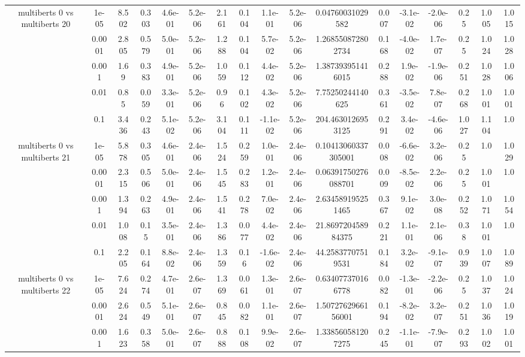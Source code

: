 \begin{tabular}{|c|c|c|c|c|c|c|c|c|c|c|c|c|c|c|c|c|}
\hline
\multirow{5}{*}{multiberts 0 vs multiberts 20} & 1e-05 & 8.502 & 0.303 & 4.6e-01 & 5.2e-06 & 2.161 & 0.104 & 1.1e-01 & 5.2e-06 & 0.04760031029582 & 0.007 & -3.1e-02 & -2.0e-06 & 0.25 & 1.005 & 1.015 \\
 & 0.0001 & 2.805 & 0.579 & 5.0e-01 & 5.2e-06 & 1.288 & 0.104 & 5.7e-02 & 5.2e-06 & 1.268550872802734 & 0.168 & -4.0e-02 & 1.7e-07 & 0.25 & 1.024 & 1.028 \\
 & 0.001 & 1.69 & 0.383 & 4.9e-01 & 5.2e-06 & 1.059 & 0.112 & 4.4e-02 & 5.2e-06 & 1.387393951416015 & 0.288 & 1.9e-02 & -1.9e-06 & 0.251 & 1.028 & 1.006 \\
 & 0.01 & 0.85 & 0.059 & 3.3e-01 & 5.2e-06 & 0.96 & 0.102 & 4.3e-02 & 5.2e-06 & 7.75250244140625 & 0.361 & -3.5e-02 & 7.8e-07 & 0.268 & 1.001 & 1.001 \\
 & 0.1 & 3.436 & 0.243 & 5.1e-02 & 5.2e-06 & 3.104 & 0.111 & -1.1e-02 & 5.2e-06 & 204.4630126953125 & 0.291 & 3.4e-02 & -4.6e-06 & 1.027 & 1.104 & 1.0 \\
\hline
\multirow{5}{*}{multiberts 0 vs multiberts 21} & 1e-05 & 5.878 & 0.305 & 4.6e-01 & 2.4e-06 & 1.524 & 0.259 & 1.0e-01 & 2.4e-06 & 0.10413060337305001 & 0.008 & -6.6e-02 & 3.2e-06 & 0.25 & 1.0 & 1.029 \\
 & 0.0001 & 2.315 & 0.506 & 5.0e-01 & 2.4e-06 & 1.545 & 0.283 & 1.2e-01 & 2.4e-06 & 0.06391750276088701 & 0.009 & -8.5e-02 & 2.2e-06 & 0.25 & 1.001 & 1.0 \\
 & 0.001 & 1.394 & 0.263 & 4.9e-01 & 2.4e-06 & 1.541 & 0.278 & 7.0e-02 & 2.4e-06 & 2.634589195251465 & 0.367 & 9.1e-02 & 3.0e-08 & 0.252 & 1.071 & 1.054 \\
 & 0.01 & 1.008 & 0.15 & 3.5e-01 & 2.4e-06 & 1.386 & 0.077 & 4.4e-02 & 2.4e-06 & 21.869720458984375 & 0.221 & 1.1e-01 & 2.1e-06 & 0.38 & 1.001 & 1.0 \\
 & 0.1 & 2.205 & 0.164 & 8.8e-02 & 2.4e-06 & 1.359 & 0.16 & -1.6e-02 & 2.4e-06 & 44.25837707519531 & 0.184 & 3.2e-02 & -9.1e-07 & 0.939 & 1.007 & 1.089 \\
\hline
\multirow{5}{*}{multiberts 0 vs multiberts 22} & 1e-05 & 7.624 & 0.274 & 4.7e-01 & 2.6e-07 & 1.369 & 0.061 & 1.3e-01 & 2.6e-07 & 0.634077370166778 & 0.082 & -1.3e-01 & -2.2e-06 & 0.25 & 1.037 & 1.024 \\
 & 0.0001 & 2.624 & 0.549 & 5.1e-01 & 2.6e-07 & 0.845 & 0.082 & 1.1e-01 & 2.6e-07 & 1.5072762966156001 & 0.194 & -8.2e-02 & 3.2e-07 & 0.251 & 1.036 & 1.019 \\
 & 0.001 & 1.623 & 0.358 & 5.0e-01 & 2.6e-07 & 0.888 & 0.108 & 9.9e-02 & 2.6e-07 & 1.338560581207275 & 0.245 & -1.1e-01 & -7.9e-07 & 0.293 & 1.002 & 1.001 \\

\end{tabular}
